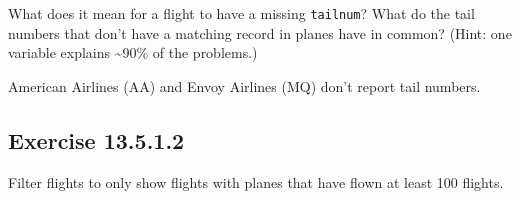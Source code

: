 \documentclass[]{book}
\newenvironment{Shaded}{\begin{snugshade}}{\end{snugshade}}
\newcommand{\CommentTok}[1]{\textcolor[rgb]{0.56,0.35,0.01}{\textit{#1}}}
\newcommand{\DataTypeTok}[1]{\textcolor[rgb]{0.13,0.29,0.53}{#1}}
\newcommand{\KeywordTok}[1]{\textcolor[rgb]{0.13,0.29,0.53}{\textbf{#1}}}
\newcommand{\NormalTok}[1]{#1}
\newcommand{\OperatorTok}[1]{\textcolor[rgb]{0.81,0.36,0.00}{\textbf{#1}}}
\newcommand{\OtherTok}[1]{\textcolor[rgb]{0.56,0.35,0.01}{#1}}
\newcommand{\StringTok}[1]{\textcolor[rgb]{0.31,0.60,0.02}{#1}}
\theoremstyle{plain}
\theoremstyle{remark}
\begin{document}
What does it mean for a flight to have a missing \texttt{tailnum}? What do the tail numbers that don't have a matching record in planes have in common? (Hint: one variable explains \textasciitilde{}90\% of the problems.)

American Airlines (AA) and Envoy Airlines (MQ) don't report tail numbers.

\begin{Shaded}
\end{Shaded}

\hypertarget{exercise-13.5.1.2}{%
\subsection*{\texorpdfstring{Exercise {13.5.1.2}}{Exercise 13.5.1.2}}\label{exercise-13.5.1.2}}

Filter flights to only show flights with planes that have flown at least 100 flights.
\end{document}
